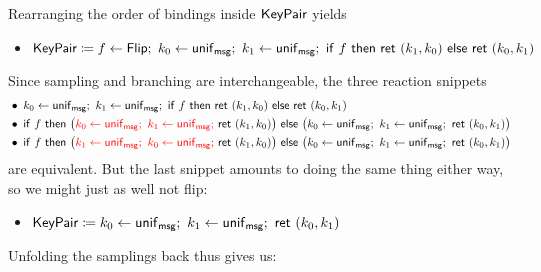 \noindent Rearranging the order of bindings inside $\mathsf{KeyPair}$ yields
\begin{itemize}
\item $\KeyPair \coloneqq f \leftarrow \Flip; \ k_0 \leftarrow \unif_\msg; \ k_1 \leftarrow \unif_\msg; \ \ifte{f}{\ret{(k_1,k_0)}}{\ret{(k_0,k_1)}}$
\end{itemize}
Since sampling and branching are interchangeable, the three reaction snippets
\begin{align*}
& \bullet \; k_0 \leftarrow \unif_\msg; \ k_1 \leftarrow \unif_\msg; \ \ifte{f}{\ret{(k_1,k_0)}}{\ret{(k_0,k_1)}} \\
& \bullet \; \ifte{f}{\big({\color{red} k_0 \leftarrow \unif_\msg; \ k_1 \leftarrow \unif_\msg; \ } \ret{(k_1,k_0)}\big)}{\big(k_0 \leftarrow \unif_\msg; \ k_1 \leftarrow \unif_\msg; \ \ret{(k_0,k_1)}\big)} \\
& \bullet \; \ifte{f}{\big({\color{red} k_1 \leftarrow \unif_\msg; \ k_0 \leftarrow \unif_\msg; \ } \ret{(k_1,k_0)}\big)}{\big(k_0 \leftarrow \unif_\msg; \ k_1 \leftarrow \unif_\msg; \ \ret{(k_0,k_1)}\big)}
\end{align*}
are equivalent. But the last snippet amounts to doing the same thing either way, so we might just as well not flip:
\begin{itemize}
\item $\KeyPair \coloneqq k_0 \leftarrow \unif_\msg; \ k_1 \leftarrow \unif_\msg; \ \ret{(k_0,k_1)}$
\end{itemize}
Unfolding the samplings back thus gives us:

